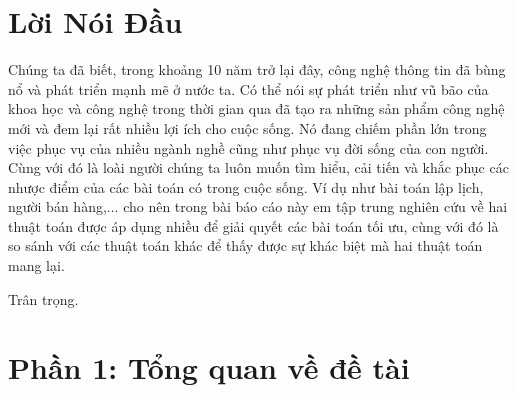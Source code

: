 \documentclass[14pt]{article}
\begin{document}
	\tableofcontents %
	\newpage
	\section*{Lời Nói Đầu}
	\begin{flushleft}
		Chúng ta đã biết, trong khoảng 10 năm trở lại đây, công nghệ thông tin đã bùng nổ và phát triển mạnh mẽ ở nước ta. Có thể nói sự phát triển như vũ bão của khoa học và công nghệ trong thời gian qua đã tạo ra những sản phẩm công nghệ mới và đem lại rất nhiều lợi ích cho cuộc sống. Nó đang chiếm phần lớn trong việc phục vụ của nhiều ngành nghề cũng như phục vụ đời sống của con người. Cùng với đó là loài người chúng ta luôn muốn tìm hiểu, cải tiến và khắc phục các nhược điểm của các bài toán có trong cuộc sống. Ví dụ như bài toán lập lịch, người bán hàng,... cho nên trong bài báo cáo này em tập trung nghiên cứu về hai thuật toán được áp dụng nhiều để giải quyết các bài toán tối ưu, cùng với đó là so sánh với các thuật toán khác để thấy được sự khác biệt mà hai thuật toán mang lại.
		
		Trân trọng.
	\end{flushleft}

	
	\newpage
	\section{Phần 1: Tổng quan về đề tài}
\end{document}
